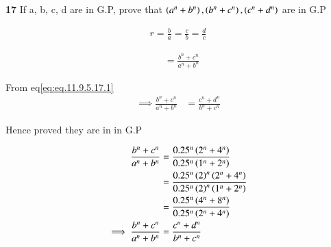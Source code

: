 \documentclass[journal,12pt,twocolumn]{IEEEtran}
\theoremstyle{remark}
\begin{document}


\vspace{3cm}

\title{}
\author{EE23BTECH11047 - Deepakreddy P
}
\maketitle
\newpage
\bigskip

\noindent \textbf{17} \quad 
If a, b, c, d are in G.P, prove that 
$ \left(a^{n} + b^{n}\right),\left(b^{n} + c^{n}\right),\left(c^{n} + d^{n}\right) $ are in G.P \\
\solution

\begin{center}
    \begin{table}[ht]
        
    \end{table}
\end{center}

\begin{align}   
r=\frac{b}{a} = \frac{c}{b}= \frac{d}{c} \label{eq:eq.11.9.5.17.1}
\end{align}

\begin{align} 
   &= \frac{b^n + c^n }{a^n + b^n}
\end{align}

From eq\eqref{eq:eq.11.9.5.17.1}\\

\begin{align}
\implies \frac{b^n + c^n }{a^n + b^n} &= \frac{c^n + d^n}{b^n + c^n}
\end{align}

Hence proved they are in in G.P

\bigskip  
\begin{center}
    \begin{table}[ht]
        
    \end{table}
\end{center}

\begin{align}
\frac{b^n + c^n}{a^n + b^n} &= \frac{0.25^n \left(2^n + 4^n\right)}{0.25^n \left(1^n + 2^n\right)}\\
&= \frac{0.25^n  \left(2\right)^n \left(2^n + 4^n\right)}{0.25^n \left(2\right)^n \left(1^n + 2^n\right)}\\
&= \frac{0.25^n \left(4^n + 8^n\right)}{0.25^n \left(2^n + 4^n\right)}\\
\implies \frac{b^n + c^n }{a^n + b^n} &= \frac{c^n + d^n}{b^n + c^n}
\end{align}
\end{document}
